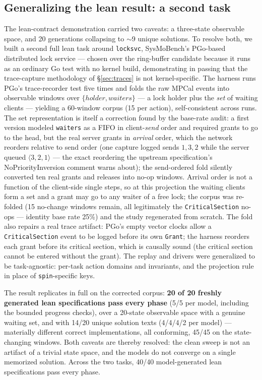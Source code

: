 \documentclass[11pt]{article}
\begin{document}
\subsection{Generalizing the lean result: a second task}
\label{sec:locksvc}

The lean-contract demonstration carried two caveats: a three-state
observable space, and 20 generations collapsing to $\sim$9 unique
solutions. To resolve both, we built a second full lean task around
\texttt{locksvc}, SysMoBench's PGo-based distributed lock service ---
chosen over the ring-buffer candidate because it runs as an ordinary Go
test with no kernel build, demonstrating in passing that the trace-capture
methodology of \S\ref{sec:traces} is not kernel-specific. The harness runs
PGo's trace-recorder test five times and folds the raw MPCal events into
observable windows over $\{\mathit{holder}, \mathit{waiters}\}$ --- a lock
holder plus the \emph{set} of waiting clients --- yielding a 60-window
corpus (15 per action), self-consistent across runs. The set representation
is itself a correction found by the base-rate audit: a first version modeled
\texttt{waiters} as a FIFO in client-\emph{send} order and required grants
to go to the head, but the real server grants in \emph{arrival} order, which
the network reorders relative to send order (one capture logged sends
$1,3,2$ while the server queued $\langle 3,2,1\rangle$ --- the exact
reordering the upstream specification's NoPriorityInversion comment warns
about); the send-ordered fold silently converted ten real grants and
releases into no-op windows. Arrival order is not a function of the
client-side single steps, so at this projection the waiting clients form a
set and a grant may go to any waiter of a free lock; the corpus was
re-folded (15 no-change windows remain, all legitimately the
\texttt{CriticalSection} no-ops --- identity base rate 25\%) and the study
regenerated from scratch. The fold also repairs a real trace artifact: PGo's
empty vector clocks allow a \texttt{CriticalSection} event to be logged
before its own \texttt{Grant}; the harness reorders each grant before its
critical section, which is causally sound (the critical section cannot be
entered without the grant). The replay and drivers were generalized to be
task-agnostic: per-task action domains and invariants, and the projection
rule in place of \texttt{spin}-specific keys.

The result replicates in full on the corrected corpus: \textbf{20 of 20
freshly generated lean specifications pass every phase} (5/5 per model,
including the bounded progress checks), over a 20-state observable space
with a genuine waiting set, and with 14/20 unique solution texts (4/4/4/2
per model) --- materially different correct implementations, all conforming,
45/45 on the state-changing windows. Both caveats are thereby resolved: the
clean sweep is not an artifact of a trivial state space, and the models do
not converge on a single memorized solution. Across the two tasks, 40/40
model-generated lean specifications pass every phase.
\end{document}
